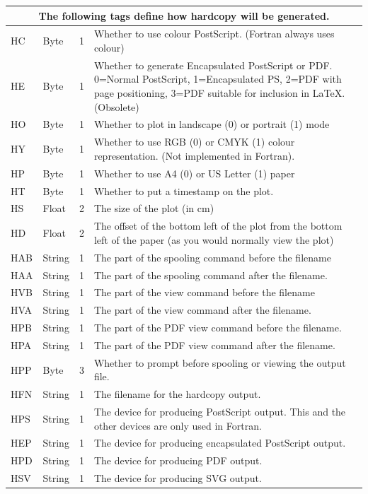 \documentclass[english]{article}
\begin{document}
\begin{longtable}{|llcp{9cm}|}
  \hline
  \multicolumn{4}{|c|}{The following tags define how hardcopy will be
    generated.}\\ 
  \hline HC& Byte& 1&
  Whether to use colour PostScript. (Fortran always uses colour)\\
  HE& Byte& 1&
  Whether to generate Encapsulated PostScript or PDF. 0=Normal
  PostScript, 1=Encapsulated PS, 2=PDF with page positioning, 3=PDF
  suitable for inclusion in \LaTeX. (Obsolete)\\
  HO& Byte& 1&
  Whether to plot in landscape (0) or portrait (1) mode\\
  HY& Byte & 1 & Whether to use RGB (0) or CMYK (1) colour
  representation. (Not implemented in Fortran).\\
  HP& Byte& 1&
  Whether to use A4 (0) or US Letter (1) paper\\
  HT& Byte& 1&
  Whether to put a timestamp on the plot.\\
  HS& Float& 2&
  The size of the plot (in cm)\\
  HD& Float& 2& The offset of the bottom left of the plot from the
  bottom left of the
  paper (as you would normally view the plot)\\
  HAB& String& 1&
  The part of the spooling command before the filename\\
  HAA& String& 1&
  The part of the spooling command after the filename.\\
  HVB& String& 1&
  The part of the view command before the filename\\
  HVA& String& 1&
  The part of the view command after the filename.\\
  HPB & String & 1 &
  The part of the PDF view command before the filename.\\
  HPA & String & 1 &
  The part of the PDF view command after the filename.\\
  HPP & Byte & 3 &
  Whether to prompt before spooling or viewing the output file.\\
  HFN& String & 1 & The filename for the hardcopy output.\\
  HPS & String & 1 & The device for producing PostScript output. This
  and the other devices are only used in Fortran.\\
  HEP & String & 1 & The device for producing encapsulated PostScript output.\\
  HPD & String & 1 & The device for producing PDF output.\\
  HSV & String & 1 & The device for producing SVG output.\\


\end{longtable}
\end{document}
